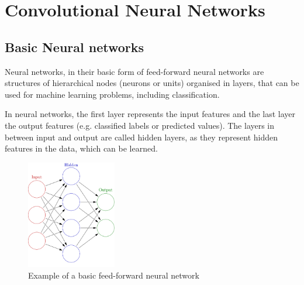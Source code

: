 \chapter{Convolutional Neural Networks}\label{chap:CNN}
\section{Basic Neural networks}\label{section:neural}
Neural networks, in their basic form of feed-forward neural networks are structures of hierarchical nodes (neurons or units) organised in layers, that can be used for machine learning problems, including classification. 

\par
In neural networks, the first layer represents the input features and the last layer the output features (e.g. classified labels or predicted values). The layers in between input and output are called hidden layers, as they represent hidden features in the data, which can be learned.

\begin{figure}[H]
    \centering
    \includegraphics[width=0.35\textwidth]{Pictures/neural_network.png}
    \caption{Example of a basic feed-forward neural network}
    \label{fig:neural_network}
\end{figure}

